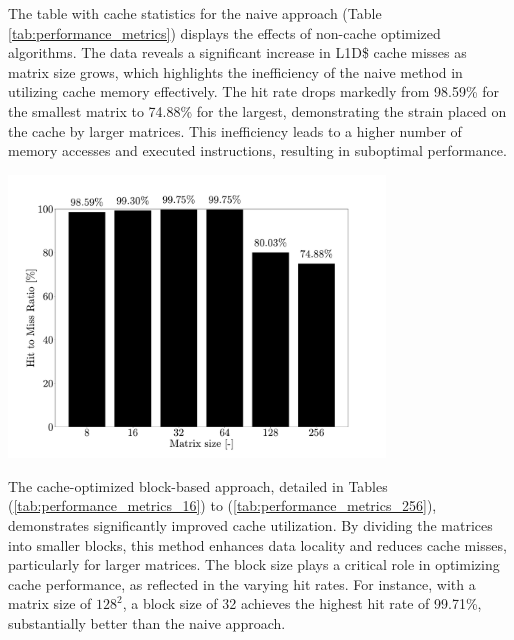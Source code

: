 The table with cache statistics for the naive approach (Table \ref{tab:performance_metrics}) displays the effects of non-cache optimized algorithms. The data reveals a significant
increase in L1D\$ cache misses as matrix size grows, which highlights the inefficiency of the naive method in utilizing cache memory effectively. The hit rate drops markedly from
98.59\% for the smallest matrix to 74.88\% for the largest, demonstrating the strain placed on the cache by larger matrices. This inefficiency leads to a higher number of memory
accesses and executed instructions, resulting in suboptimal performance.

\begin{center}
	\centering
	\includegraphics[width=0.75\textwidth]{figures/05-analysis/mm_naive_results.pdf}
	\label{fig:mm_naive_results}
\end{center}

\noindent The cache-optimized block-based approach, detailed in Tables (\ref{tab:performance_metrics_16}) to (\ref{tab:performance_metrics_256}), demonstrates significantly
improved cache utilization. By dividing the matrices into smaller blocks, this method enhances data locality and reduces cache misses, particularly for larger matrices. The block
size plays a critical role in optimizing cache performance, as reflected in the varying hit rates. For instance, with a matrix size of \( 128^2 \), a block size of 32 achieves the
highest hit rate of 99.71\%, substantially better than the naive approach.


